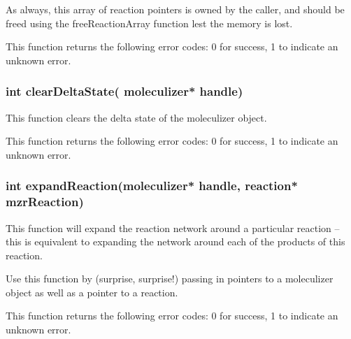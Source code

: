 As always, this array of reaction pointers is owned by the caller, and
should be freed using the freeReactionArray function lest the memory is
lost.

This function returns the following error codes: 0 for success, 1 to
indicate an unknown error.

\subsubsection{int clearDeltaState( moleculizer* handle)}
This function clears the delta state of the moleculizer object.  

This function returns the following error codes: 0 for success, 1 to
indicate an unknown error.

\subsubsection{int expandReaction(moleculizer* handle, reaction*
  mzrReaction)}
This function will expand the reaction network around a particular
reaction -- this is equivalent to expanding the network around each of
the products of this reaction.  

Use this function by (surprise, surprise!) passing in pointers to a
moleculizer object as well as a pointer to a reaction.  

This function returns the following error codes: 0 for success, 1 to
indicate an unknown error.

